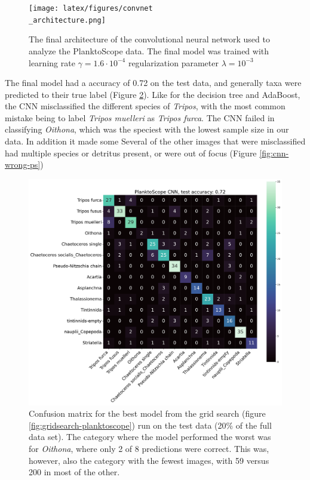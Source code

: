 \begin{figure}
    \centering
    \texttt{[image: latex/figures/convnet\\\_architecture.png]}
    \caption{The final architecture of the convolutional neural network used to analyze the PlanktoScope data. The final model was trained with learning rate $\gamma=1.6 \cdot 10^{-4}$ regularization parameter $\lambda = 10^{-3}$}
    \label{fig:conv-arch}
\end{figure}

The final model had a accuracy of 0.72 on the test data, and generally taxa were predicted to their true label (Figure \ref{fig:confusion-planktoscope}). Like for the decision tree and AdaBoost, the CNN misclassified the different species of \textit{Tripos}, with the most common mistake being to label \textit{Tripos muelleri} as \textit{Tripos furca}. The CNN failed in classifying \textit{Oithona}, which was the speciest with the lowest sample size in our data. In addition it made some Several of the other images that were misclassified had multiple species or detritus present, or were out of focus (Figure \ref{fig:cnn-wrong-ps})

\begin{figure}
    \centering
    \includegraphics[width=\linewidth]{examples/tests_even/figs/confusion-matrix-2024-12-06_1241.pdf}
    \caption{Confusion matrix for the best model from the grid search (figure \ref{fig:gridsearch-planktoscope}) run on the test data (20\% of the full data set). The category where the model performed the worst was for \textit{Oithona}, where only 2 of 8 predictions were correct. This was, however, also the category with the fewest images, with 59 versus 200 in most of the other.}
    \label{fig:confusion-planktoscope}
\end{figure}


